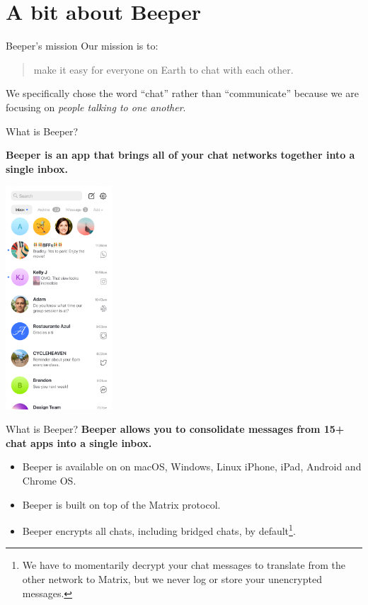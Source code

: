 \documentclass{beeper}
\begin{document}
\section{A bit about Beeper}

\begin{frame}{Beeper's mission}
    Our mission is to:\\

    \begin{quote}
        make it easy for everyone on Earth to chat with each other.
    \end{quote}
    \pause

    We specifically chose the word ``chat'' rather than ``communicate'' because
    we are focusing on \textit{people talking to one another}.
\end{frame}

\begin{frame}{What is Beeper?}
    \begin{center}
        \textbf{Beeper is an app that brings all of your chat networks together into
            a single inbox.}
    \end{center}
    \centerline{\includegraphics[width=0.3\textwidth]{images/beeper-mobile}}
\end{frame}

\begin{frame}{What is Beeper?}
    \textbf{Beeper allows you to consolidate messages from 15+ chat apps into a
        single inbox.}

    \pause
    \begin{itemize}
        \item Beeper is available on on macOS, Windows, Linux iPhone, iPad,
            Android and Chrome OS.
        \item Beeper is built on top of the Matrix protocol.
        \item Beeper encrypts all chats, including bridged chats, by
            default\footnote[frame]{We have to momentarily decrypt your chat
            messages to translate from the other network to Matrix, but we never
            log or store your unencrypted messages.}.
    \end{itemize}
\end{frame}
\end{document}
